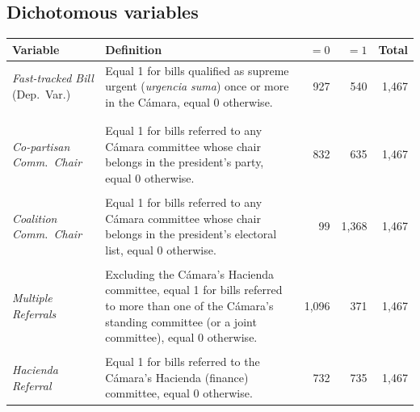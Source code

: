 \documentclass[letter,12pt]{article}
\begin{document}
\subsection{Dichotomous variables}\label{s:descriptives-dummies}

\begin{footnotesize}
\singlespacing
\begin{tabularx}{\textwidth}{lXrrr} %
 Variable                      & Definition &   $=0$ &  $=1$ & Total \\ [.5ex] \hline
\emph{Fast-tracked Bill} (Dep.~Var.) & Equal 1 for bills qualified as supreme urgent (\emph{urgencia suma}) once or more in the Cámara, equal 0 otherwise.          &    927  &   540 & 1,467 \\ [.5ex] %
\\ [-1ex]
\\ [-1ex]
\emph{Co-partisan Comm.~Chair}       & Equal 1 for bills referred to any Cámara committee whose chair belongs in the president's party, equal 0 otherwise.          &    832 &   635 & 1,467 \\ [.5ex] %
\\ [-1ex]
\emph{Coalition Comm.~Chair}         & Equal 1 for bills referred to any Cámara committee whose chair belongs in the president's electoral list, equal 0 otherwise. &     99 & 1,368 & 1,467 \\ [.5ex] %
\\ [-1ex]
\emph{Multiple Referrals}            & Excluding the Cámara's Hacienda committee, equal 1 for bills referred to more than one of the Cámara's standing committee (or a joint committee), equal 0 otherwise. &  1,096 &   371 & 1,467 \\ [.5ex] %
\\ [-1ex]
\emph{Hacienda Referral}             & Equal 1 for bills referred to the Cámara's Hacienda (finance) committee, equal 0 otherwise.                                  &    732 &   735 & 1,467 \\ [.5ex] %

\end{tabularx}
\end{footnotesize}
\end{document}
